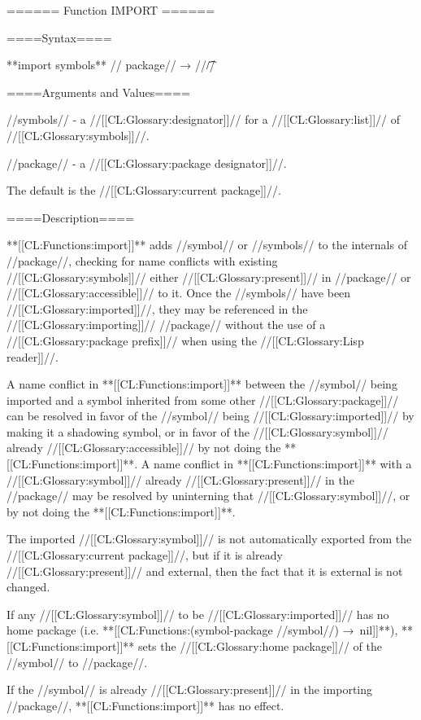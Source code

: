 ====== Function IMPORT ======

====Syntax====

**import {symbols** //\opt} package// → //\t//

====Arguments and Values====

//symbols// - a //[[CL:Glossary:designator]]// for a //[[CL:Glossary:list]]// of //[[CL:Glossary:symbols]]//.

//package// - a //[[CL:Glossary:package designator]]//.

The default is the //[[CL:Glossary:current package]]//.

====Description====

**[[CL:Functions:import]]** adds //symbol// or //symbols// to the internals of //package//, checking for name conflicts with existing //[[CL:Glossary:symbols]]// either //[[CL:Glossary:present]]// in //package// or //[[CL:Glossary:accessible]]// to it. Once the //symbols// have been //[[CL:Glossary:imported]]//, they may be referenced in the //[[CL:Glossary:importing]]// //package// without the use of a //[[CL:Glossary:package prefix]]// when using the //[[CL:Glossary:Lisp reader]]//.

A name conflict in **[[CL:Functions:import]]** between the //symbol// being imported and a symbol inherited from some other //[[CL:Glossary:package]]// can be resolved in favor of the //symbol// being //[[CL:Glossary:imported]]// by making it a shadowing symbol, or in favor of the //[[CL:Glossary:symbol]]// already //[[CL:Glossary:accessible]]// by not doing the **[[CL:Functions:import]]**. A name conflict in **[[CL:Functions:import]]** with a //[[CL:Glossary:symbol]]// already //[[CL:Glossary:present]]// in the //package// may be resolved by uninterning that //[[CL:Glossary:symbol]]//, or by not doing the **[[CL:Functions:import]]**.

The imported //[[CL:Glossary:symbol]]// is not automatically exported from the //[[CL:Glossary:current package]]//, but if it is already //[[CL:Glossary:present]]// and external, then the fact that it is external is not changed.

If any //[[CL:Glossary:symbol]]// to be //[[CL:Glossary:imported]]// has no home package (i.e. **[[CL:Functions:(symbol-package //symbol//) →\ nil]]**), **[[CL:Functions:import]]** sets the //[[CL:Glossary:home package]]// of the //symbol// to //package//.

If the //symbol// is already //[[CL:Glossary:present]]// in the importing //package//, **[[CL:Functions:import]]** has no effect.

